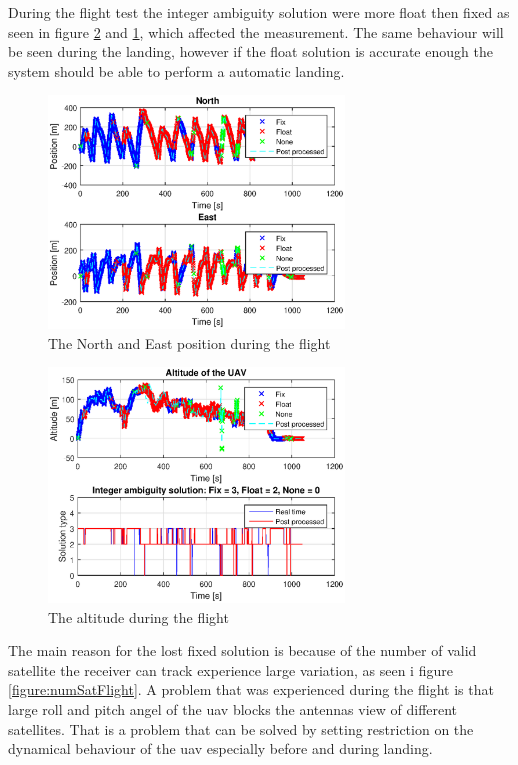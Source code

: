 During the flight test the integer ambiguity solution were more float then fixed as seen in figure \ref{figure:DownFlight} and \ref{figure:NorthEastFlight}, which affected the measurement. The same behaviour will be seen during the landing, however if the float solution is accurate enough the system should be able to perform a automatic landing.
\begin{figure}[H]
	\centering
		\includegraphics[width=0.7\textwidth]{figs/plots/northEastFlight.eps}
		\caption{The North and East position during the flight}
		\label{figure:NorthEastFlight}
\end{figure}
\begin{figure}[H]
	\centering
		\includegraphics[width=0.7\textwidth]{figs/plots/AltitudeFlight.eps}
		\caption{The altitude during the flight}
		\label{figure:DownFlight}
\end{figure}
The main reason for the lost fixed solution is because of the number of valid satellite the receiver can track experience large variation, as seen i figure \ref{figure:numSatFlight}. A problem that was experienced during the flight is that large roll and pitch angel of the \gls{uav} blocks the antennas view of different satellites. That is a problem that can be solved by setting restriction on the dynamical behaviour of the \gls{uav} especially before and during landing.
